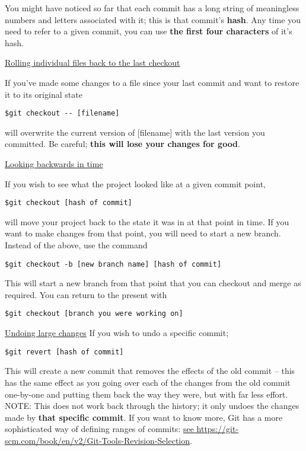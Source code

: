 \documentclass[11pt, a4paper, english]{article}
\begin{document}
You might have noticed so far that each commit has a long string of meaningless numbers and letters associated with it; this is that commit's \textbf{hash}. Any time you need to refer to a given commit, you can use \textbf{the first four characters} of it's hash.

\underline{Rolling individual files back to the last checkout}

If you've made some changes to a file since your last commit and want to restore it to its original state
\begin{verbatim}
$git checkout -- [filename]
\end{verbatim}

will overwrite the current version of [filename] with the last version you committed. Be careful; \textbf{this will lose your changes for good}.

\underline{Looking backwards in time}

If you wish to see what the project looked like at a given commit point,
\begin{verbatim}
$git checkout [hash of commit]
\end{verbatim}
will move your project back to the state it was in at that point in time.
If you want to make changes from that point, you will need to start a new branch. Instead of the above, use the command
\begin{verbatim}
$git checkout -b [new branch name] [hash of commit]
\end{verbatim}
This will start a new branch from that point that you can checkout and merge as required.
You can return to the present with
\begin{verbatim}
$git checkout [branch you were working on]
\end{verbatim}

\underline{Undoing large changes}
If you wish to undo a specific commit;
\begin{verbatim}
$git revert [hash of commit]
\end{verbatim}
This will create a new commit that removes the effects of the old commit -- this has the same effect as you going over each of the changes from the old commit one-by-one and putting them back the way they were, but with far less effort.
NOTE: This does not work back through the history; it only undoes the changes made by \textbf{that specific commit}. If you want to know more, Git has a more sophisticated way of defining ranges of commits: \url{see https://git-scm.com/book/en/v2/Git-Tools-Revision-Selection}.
\end{document}
